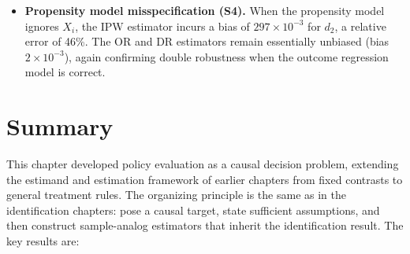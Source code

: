 \documentclass[master.tex]{subfiles}
\begin{document}
\begin{itemize}
    A secondary consequence of outcome model misspecification is policy
    degradation of $d_3$.  Because the pooled linear model estimates
    the CATE as a positive constant (the coefficient on $A_i$ in the
    pooled regression), the policy $d_3$ collapses to the treat-all
    rule $d_1$ in every replication.  The DR estimator of $V(d_3)$
    in S3 is approximately $0.501$, which is unbiased for $V(d_1)$,
    not $V(d^*)$: the estimator is functioning correctly, but it is
    evaluating the wrong policy.

  \item \textbf{Propensity model misspecification (S4).}  When the
    propensity model ignores $X_i$, the IPW estimator incurs a bias of
    $297\times 10^{-3}$ for $d_2$, a relative error of 46\%.  The OR
    and DR estimators remain essentially unbiased (bias
    $2\times 10^{-3}$), again confirming double robustness when the
    outcome regression model is correct.

\end{itemize}

\section{Summary}
\label{w13:sec:summary}

This chapter developed policy evaluation as a causal decision problem, extending the estimand and estimation framework of earlier chapters from fixed contrasts to general treatment rules. The organizing principle is the same as in the identification chapters: pose a causal target, state sufficient assumptions, and then construct sample-analog estimators that inherit the identification result. The key results are:
\end{document}
